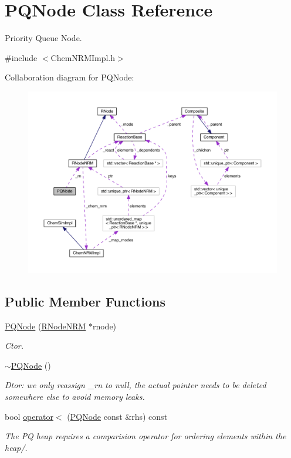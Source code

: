 \hypertarget{classPQNode}{\section{P\+Q\+Node Class Reference}
\label{classPQNode}
}


Priority Queue Node.  




{\ttfamily \#include $<$Chem\+N\+R\+M\+Impl.\+h$>$}



Collaboration diagram for P\+Q\+Node\+:
\nopagebreak
\begin{figure}[H]
\begin{center}
\leavevmode
\includegraphics[width=350pt]{classPQNode__coll__graph}
\end{center}
\end{figure}
\subsection*{Public Member Functions}
\begin{DoxyCompactItemize}
\item 
\hyperlink{classPQNode_a4b7e508ee10dbc6cb1bbabf8bcda593a}{P\+Q\+Node} (\hyperlink{classRNodeNRM}{R\+Node\+N\+R\+M} $\ast$rnode)
\begin{DoxyCompactList}\small\item\em Ctor. \end{DoxyCompactList}\item 
\hyperlink{classPQNode_ac96492ddb5848c1d3cad999299caa77c}{$\sim$\+P\+Q\+Node} ()
\begin{DoxyCompactList}\small\item\em Dtor\+: we only reassign \+\_\+rn to null, the actual pointer needs to be deleted somewhere else to avoid memory leaks. \end{DoxyCompactList}\item 
bool \hyperlink{classPQNode_ac8c314f7f49375577b4b8ef2d90910b2}{operator$<$} (\hyperlink{classPQNode}{P\+Q\+Node} const \&rhs) const 
\begin{DoxyCompactList}\small\item\em The P\+Q heap requires a comparision operator for ordering elements within the heap/. \end{DoxyCompactList}\end{DoxyCompactItemize}
